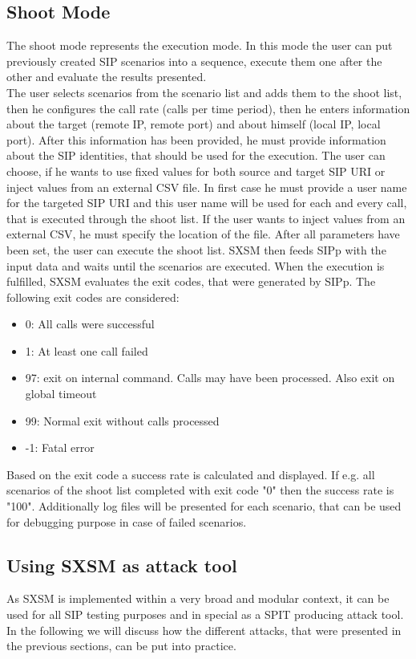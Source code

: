 \documentclass[final
	]{issa}
\begin{document}
\subsection{Shoot Mode}
The shoot mode represents the execution mode. In this mode the user can put previously created SIP scenarios into a sequence, execute them one after the other and evaluate the results presented.\\The user selects scenarios from the scenario list and adds them to the shoot list, then he configures the call rate (calls per time period), then he enters information about the target (remote IP, remote port) and about himself (local IP, local port). After this information has been provided, he must provide information about the SIP identities, that should be used for the execution. The user can choose, if he wants to use fixed values for both source and target SIP URI or inject values from an external CSV file. In first case he must provide a user name for the targeted SIP URI and this user name will be used for each and every call, that is executed through the shoot list. If the user wants to inject values from an external CSV, he must specify the location of the file. After all parameters have been set, the user can execute the shoot list. SXSM then feeds SIPp with the input data and waits until the scenarios are executed. When the execution is fulfilled, SXSM evaluates the exit codes, that were generated by SIPp. The following exit codes are considered:
\begin{itemize}
\item 0: All calls were successful
\item 1: At least one call failed
\item 97: exit on internal command. Calls may have been processed. Also exit on global timeout
\item 99: Normal exit without calls processed
\item -1: Fatal error
\end{itemize}
Based on the exit code a success rate is calculated and displayed. If e.g. all scenarios of the shoot list completed with exit code "0" then the success rate is "100". Additionally log files will be presented for each scenario, that can be used for debugging purpose in case of failed scenarios.
\subsection{Using SXSM as attack tool} 
As SXSM is implemented within a very broad and modular context, it can be used for all SIP testing purposes and in special as a SPIT producing attack tool. In the following we will discuss how the different attacks, that were presented in the previous sections, can be put into practice.
\end{document}
